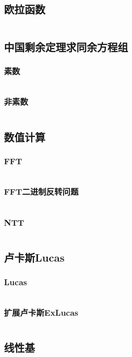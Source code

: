 \documentclass[twoside,sub3section,UTF8]{ctexart}						%
\begin{document}
	\subsection{欧拉函数}
		\inputminted{c++}{"Maths/Elur.cpp"}
	\subsection{中国剩余定理求同余方程组}
		\subsubsection{素数}
			\inputminted{c++}{"Maths/CRT(prime).cpp"}
		\subsubsection{非素数}
			\inputminted{c++}{"Maths/CRT(notprime).cpp"}
	\subsection{数值计算}
		\subsubsection{FFT}
			\inputminted{c++}{"Maths/FFT/FFT.cpp"}
		\subsubsection{FFT二进制反转问题}
			\inputminted{c++}{"Maths/FFT/FFTbitrev.cpp"}
		\subsubsection{NTT}
			\inputminted{c++}{"Maths/FFT/NTT.cpp"}
	\subsection{卢卡斯Lucas}
		\subsubsection{Lucas}
			\inputminted{c++}{"Maths/Lucas/lucas.cpp"}
		\subsubsection{扩展卢卡斯ExLucas} 
			\inputminted{c++}{"Maths/Lucas/exlucas.cpp"}
	\subsection{线性基}
		\inputminted{c++}{"Maths/xianXingJi.cpp"}
\end{document}
